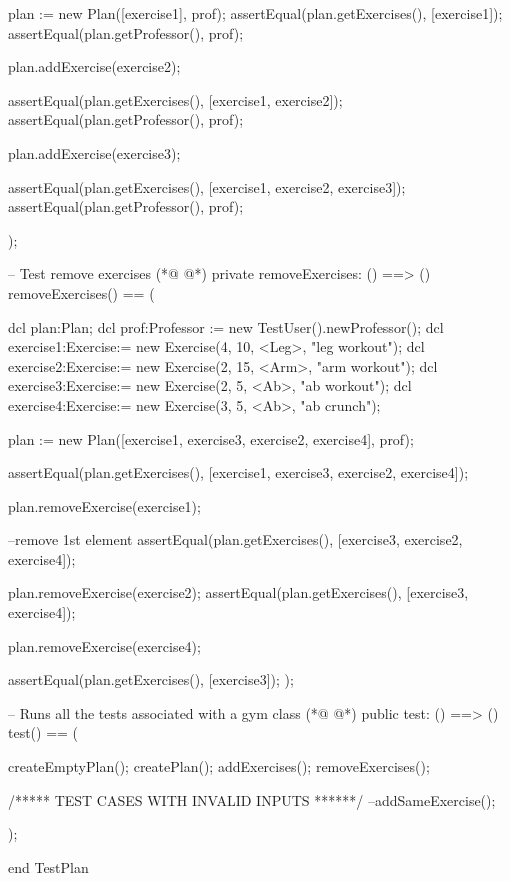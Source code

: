 \begin{vdmpp}[breaklines=true]
    plan := new Plan([exercise1], prof);  
    assertEqual(plan.getExercises(), [exercise1]);
    assertEqual(plan.getProfessor(), prof);
    
    plan.addExercise(exercise2);
    
    assertEqual(plan.getExercises(), [exercise1, exercise2]);
    assertEqual(plan.getProfessor(), prof);
    
    plan.addExercise(exercise3);
    
    assertEqual(plan.getExercises(), [exercise1, exercise2, exercise3]);
    assertEqual(plan.getProfessor(), prof);
    
 );
 
 
 -- Test remove exercises
(*@
\label{removeExercises:80}
@*)
 private removeExercises: () ==> ()
 removeExercises() == (
    
    dcl plan:Plan;
    dcl prof:Professor := new TestUser().newProfessor(); 
    dcl exercise1:Exercise:= new Exercise(4, 10, <Leg>, "leg workout");
    dcl exercise2:Exercise:= new Exercise(2, 15, <Arm>, "arm workout");
     dcl exercise3:Exercise:= new Exercise(2, 5, <Ab>, "ab workout");
     dcl exercise4:Exercise:= new Exercise(3, 5, <Ab>, "ab crunch");
  
    plan := new Plan([exercise1, exercise3, exercise2, exercise4], prof);  
 
    assertEqual(plan.getExercises(), [exercise1, exercise3, exercise2, exercise4]);
    
    plan.removeExercise(exercise1);
    
    --remove 1st element 
    assertEqual(plan.getExercises(), [exercise3, exercise2, exercise4]); 
    
    plan.removeExercise(exercise2);
    assertEqual(plan.getExercises(), [exercise3, exercise4]); 
    
    plan.removeExercise(exercise4);
    
    assertEqual(plan.getExercises(), [exercise3]); 
 );
 
  
 -- Runs all the tests associated with a gym class
(*@
\label{test:109}
@*)
 public test: () ==> ()
 test() == (
  
   createEmptyPlan();
   createPlan();
   addExercises();
   removeExercises();
  
    /***** TEST CASES WITH INVALID INPUTS ******/
   --addSameExercise();
   
 );

 
end TestPlan
\end{vdmpp}
\bigskip
